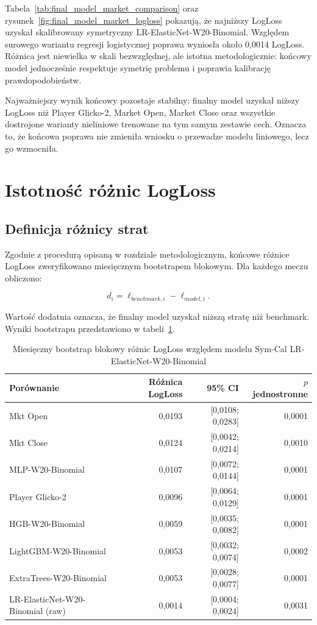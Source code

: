 Tabela~\ref{tab:final_model_market_comparison} oraz rysunek~\ref{fig:final_model_market_logloss} pokazują, że najniższy LogLoss uzyskał skalibrowany symetryczny LR-ElasticNet-W20-Binomial. Względem surowego wariantu regresji logistycznej poprawa wyniosła około 0{,}0014 LogLoss. Różnica jest niewielka w skali bezwzględnej, ale istotna metodologicznie: końcowy model jednocześnie respektuje symetrię problemu i poprawia kalibrację prawdopodobieństw.

Najważniejszy wynik końcowy pozostaje stabilny: finalny model uzyskał niższy LogLoss niż Player Glicko-2, Market Open, Market Close oraz wszystkie dostrojone warianty nieliniowe trenowane na tym samym zestawie cech. Oznacza to, że końcowa poprawa nie zmieniła wniosku o przewadze modelu liniowego, lecz go wzmocniła.

\section{Istotność różnic LogLoss}

\subsection{Definicja różnicy strat}

Zgodnie z procedurą opisaną w rozdziale metodologicznym, końcowe różnice LogLoss zweryfikowano miesięcznym bootstrapem blokowym. Dla każdego meczu obliczono:

\[
    d_i = \ell_{benchmark,i} - \ell_{model,i}.
\]

Wartość dodatnia oznacza, że finalny model uzyskał niższą stratę niż benchmark. Wyniki bootstrapu przedstawiono w tabeli~\ref{tab:logloss_block_bootstrap}.

\begin{table}[H]
    \centering
    \caption{Miesięczny bootstrap blokowy różnic LogLoss względem modelu Sym-Cal LR-ElasticNet-W20-Binomial}
    \label{tab:logloss_block_bootstrap}
    \small
    \begin{tabular}{p{5.7cm}rrr}
        \toprule
        Porównanie & Różnica LogLoss & 95\% CI & $p$ jednostronne \\
        \midrule
        Mkt Open & 0{,}0193 & [0{,}0108; 0{,}0283] & 0{,}0001 \\
        Mkt Close & 0{,}0124 & [0{,}0042; 0{,}0214] & 0{,}0010 \\
        MLP-W20-Binomial & 0{,}0107 & [0{,}0072; 0{,}0144] & 0{,}0001 \\
        Player Glicko-2 & 0{,}0096 & [0{,}0064; 0{,}0129] & 0{,}0001 \\
        HGB-W20-Binomial & 0{,}0059 & [0{,}0035; 0{,}0082] & 0{,}0001 \\
        LightGBM-W20-Binomial & 0{,}0053 & [0{,}0032; 0{,}0074] & 0{,}0002 \\
        ExtraTrees-W20-Binomial & 0{,}0053 & [0{,}0028; 0{,}0077] & 0{,}0001 \\
        LR-ElasticNet-W20-Binomial (raw) & 0{,}0014 & [0{,}0004; 0{,}0024] & 0{,}0031 \\
        \bottomrule
    \end{tabular}
\end{table}

